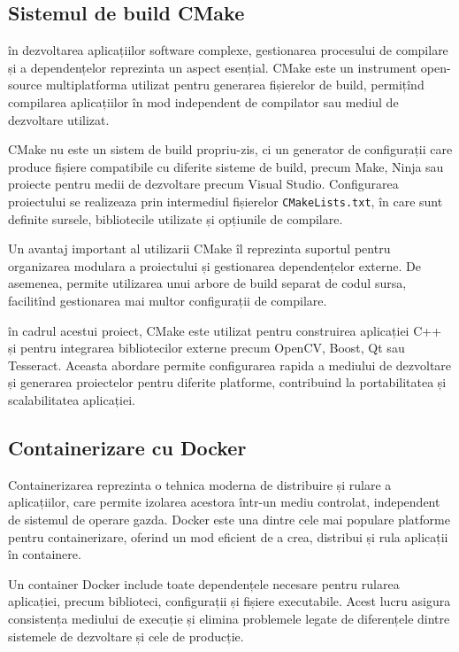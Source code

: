 \subsection*{Sistemul de build CMake}

în dezvoltarea aplicațiilor software complexe, gestionarea procesului de compilare și a dependențelor reprezinta un aspect esențial. CMake este un instrument open-source multiplatforma utilizat pentru generarea fișierelor de build, permițînd compilarea aplicațiilor în mod independent de compilator sau mediul de dezvoltare utilizat.

CMake nu este un sistem de build propriu-zis, ci un generator de configurații care produce fișiere compatibile cu diferite sisteme de build, precum Make, Ninja sau proiecte pentru medii de dezvoltare precum Visual Studio. Configurarea proiectului se realizeaza prin intermediul fișierelor \texttt{CMakeLists.txt}, în care sunt definite sursele, bibliotecile utilizate și opțiunile de compilare.

Un avantaj important al utilizarii CMake îl reprezinta suportul pentru organizarea modulara a proiectului și gestionarea dependențelor externe. De asemenea, permite utilizarea unui arbore de build separat de codul sursa, facilitînd gestionarea mai multor configurații de compilare.

în cadrul acestui proiect, CMake este utilizat pentru construirea aplicației C++ și pentru integrarea bibliotecilor externe precum OpenCV, Boost, Qt sau Tesseract. Aceasta abordare permite configurarea rapida a mediului de dezvoltare și generarea proiectelor pentru diferite platforme, contribuind la portabilitatea și scalabilitatea aplicației.

\subsection*{Containerizare cu Docker}

Containerizarea reprezinta o tehnica moderna de distribuire și rulare a aplicațiilor, care permite izolarea acestora într-un mediu controlat, independent de sistemul de operare gazda. Docker este una dintre cele mai populare platforme pentru containerizare, oferind un mod eficient de a crea, distribui și rula aplicații în containere.

Un container Docker include toate dependențele necesare pentru rularea aplicației, precum biblioteci, configurații și fișiere executabile. Acest lucru asigura consistența mediului de execuție și elimina problemele legate de diferențele dintre sistemele de dezvoltare și cele de producție.

